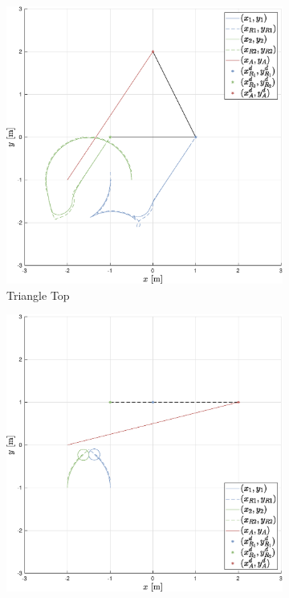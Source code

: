 \documentclass{ifacconf}
\begin{document}
\begin{figure}
    \centering
    \begin{subfigure}[b]{0.32\columnwidth}
        \centering
        \includegraphics[width=\linewidth]{images/simulations/wo_APF/1st_scenario_wo.eps}
        \caption{Triangle Top}
    \end{subfigure}
    \begin{subfigure}[b]{0.32\columnwidth}
        \centering
        \includegraphics[width=\linewidth]{images/simulations/wo_APF/2nd_scenario_wo.eps}

\end{subfigure}
\end{figure}
\end{document}
